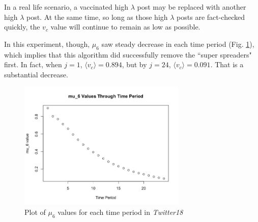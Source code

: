 \documentclass[preprint,review,12pt]{elsarticle}
\begin{document}
In a real life scenario, a vaccinated high $\lambda$ post may be replaced with another high $\lambda$ post. At the same time, so long as those high $\lambda$ posts are fact-checked quickly, the $v_c$ value will continue to remain as low as possible. 

In this experiment, though, $\mu_6$ saw steady decrease in each time period (Fig. \ref{fig:mu6 Twitter18}), which implies that this algorithm did successfully remove the ``super spreaders" first. In fact, when $j=1$, $\langle v_c \rangle = 0.894$, but by $j=24$, $\langle v_c \rangle = 0.091$. That is a substantial decrease.
\begin{figure}[h!]
    \centering
    \includegraphics[width=8cm]{mu6 graph.png}
    \caption{Plot of $\mu_6$ values for each time period in \textit{Twitter18}}
    \label{fig:mu6 Twitter18}
\end{figure}
 
\end{document}
